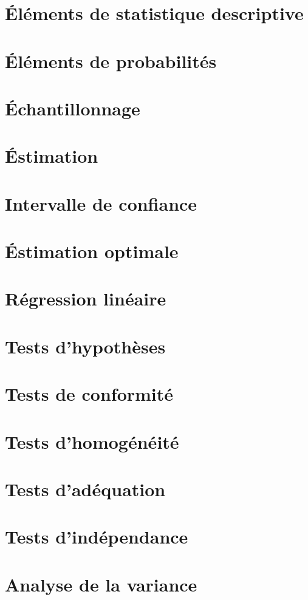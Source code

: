 \section{Éléments de statistique descriptive}


\section{Éléments de probabilités}


\section{Échantillonnage}


\section{Éstimation}


\section{Intervalle de confiance}


\section{Éstimation optimale}


\section{Régression linéaire}


\section{Tests d'hypothèses}


\section{Tests de conformité}


\section{Tests d'homogénéité}


\section{Tests d'adéquation}


\section{Tests d'indépendance}


\section{Analyse de la variance}
